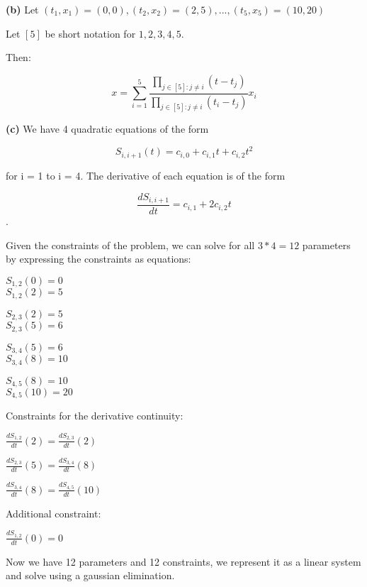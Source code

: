 \documentclass[11pt,letterpaper]{article}
\renewcommand{\part}[1] {\vspace{.10in} {\bf (#1)}}
\begin{document}
\part{b}
Let $(t_1, x_1) = (0,0), (t_2, x_2) = (2,5), ... , (t_5,x_5) = (10,20) $

Let $[5]$ be short notation for ${1,2,3,4,5}$.

Then:

$$x = \sum_{i=1}^{5} \frac{\prod_{j \in [5] : j \neq i} (t - t_j)}{\prod_{j \in [5] : j \neq i} (t_i - t_j)} x_i$$

\part{c}
We have 4 quadratic equations of the form

$$S_{i,i+1}(t) = c_{i,0} + c_{i,1} t + c_{i,2} t^2$$

for i = 1 to i = 4. The derivative of each equation is of the form

$$\frac{dS_{i,i+1}}{dt} = c_{i,1} + 2c_{i,2} t$$.

Given the constraints of the problem, we can solve for all $3 * 4 = 12$ parameters by expressing the constraints as equations:

$S_{1,2}(0) = 0$\\
$S_{1,2}(2) = 5$

$S_{2,3}(2) = 5$\\
$S_{2,3}(5) = 6$

$S_{3,4}(5) = 6$\\
$S_{3,4}(8) = 10$

$S_{4,5}(8) = 10$\\
$S_{4,5}(10) = 20$

Constraints for the derivative continuity:

$\frac{dS_{1,2}}{dt}(2) = \frac{dS_{2,3}}{dt}(2)$

$\frac{dS_{2,3}}{dt}(5) = \frac{dS_{3,4}}{dt}(8)$

$\frac{dS_{3,4}}{dt}(8) = \frac{dS_{4,5}}{dt}(10)$

Additional constraint:

$\frac{dS_{1,2}}{dt}(0) = 0$


Now we have 12 parameters and 12 constraints, we represent it as a linear system and solve using a gaussian elimination.
\end{document}
